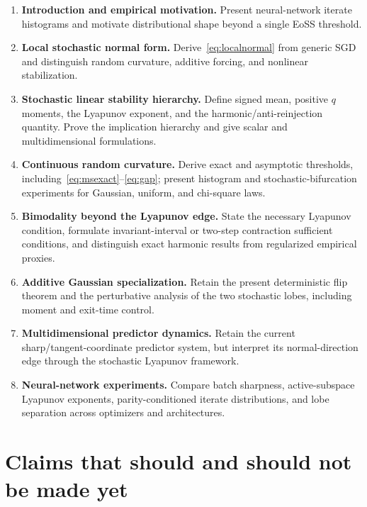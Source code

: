 \documentclass[11pt]{article}
\begin{document}
\begin{enumerate}[leftmargin=1.7em,itemsep=0.35em]
    \item \textbf{Introduction and empirical motivation.} Present neural-network iterate histograms and motivate distributional shape beyond a single EoSS threshold.
    \item \textbf{Local stochastic normal form.} Derive~\eqref{eq:localnormal} from generic SGD and distinguish random curvature, additive forcing, and nonlinear stabilization.
    \item \textbf{Stochastic linear stability hierarchy.} Define signed mean, positive $q$ moments, the Lyapunov exponent, and the harmonic/anti-reinjection quantity.  Prove the implication hierarchy and give scalar and multidimensional formulations.
    \item \textbf{Continuous random curvature.} Derive exact and asymptotic thresholds, including~\eqref{eq:msexact}--\eqref{eq:gap}; present histogram and stochastic-bifurcation experiments for Gaussian, uniform, and chi-square laws.
    \item \textbf{Bimodality beyond the Lyapunov edge.} State the necessary Lyapunov condition, formulate invariant-interval or two-step contraction sufficient conditions, and distinguish exact harmonic results from regularized empirical proxies.
    \item \textbf{Additive Gaussian specialization.} Retain the present deterministic flip theorem and the perturbative analysis of the two stochastic lobes, including moment and exit-time control.
    \item \textbf{Multidimensional predictor dynamics.} Retain the current sharp/tangent-coordinate predictor system, but interpret its normal-direction edge through the stochastic Lyapunov framework.
    \item \textbf{Neural-network experiments.} Compare batch sharpness, active-subspace Lyapunov exponents, parity-conditioned iterate distributions, and lobe separation across optimizers and architectures.
\end{enumerate}

\section{Claims that should and should not be made yet}
\end{document}
